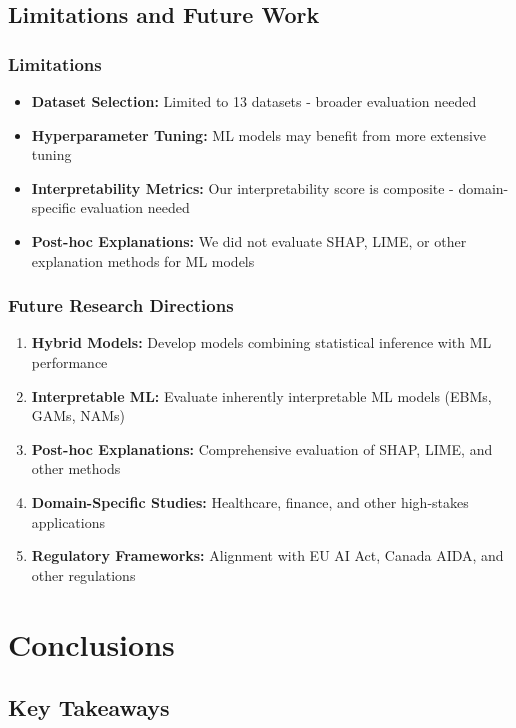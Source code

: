 \documentclass[11pt,a4paper]{article}
\begin{document}
\subsection{Limitations and Future Work}

\subsubsection{Limitations}

\begin{itemize}
    \item \textbf{Dataset Selection:} Limited to 13 datasets - broader evaluation needed
    \item \textbf{Hyperparameter Tuning:} ML models may benefit from more extensive tuning
    \item \textbf{Interpretability Metrics:} Our interpretability score is composite - domain-specific evaluation needed
    \item \textbf{Post-hoc Explanations:} We did not evaluate SHAP, LIME, or other explanation methods for ML models
\end{itemize}

\subsubsection{Future Research Directions}

\begin{enumerate}
    \item \textbf{Hybrid Models:} Develop models combining statistical inference with ML performance
    \item \textbf{Interpretable ML:} Evaluate inherently interpretable ML models (EBMs, GAMs, NAMs)
    \item \textbf{Post-hoc Explanations:} Comprehensive evaluation of SHAP, LIME, and other methods
    \item \textbf{Domain-Specific Studies:} Healthcare, finance, and other high-stakes applications
    \item \textbf{Regulatory Frameworks:} Alignment with EU AI Act, Canada AIDA, and other regulations
\end{enumerate}

\section{Conclusions}

\subsection{Key Takeaways}
\end{document}
